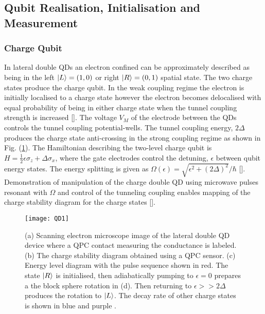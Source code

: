\subsection{Qubit Realisation, Initialisation and Measurement}
\subsubsection{Charge Qubit}
In lateral double QDs an electron confined can be approximately described as being in the left $\lvert L\rangle=(1,0)$ or right $\lvert R\rangle=(0,1)$ spatial state. The two charge states produce the charge qubit. In the weak coupling regime the electron is initially localised to a charge state however the electron becomes delocalised with equal probability of being in either charge state when the tunnel coupling strength is increased []. The voltage $V_{M}$ of the electrode between the QDs controls the tunnel coupling potential-wells. The tunnel coupling energy, $2\Delta$ produces the charge state anti-crossing in the strong coupling regime as shown in Fig. (\ref{fig:QD1}). The Hamiltonian describing the two-level charge qubit is $H=\frac{1}{2}\epsilon \sigma_{z}+\Delta\sigma_{x}$, where the gate electrodes control the detuning, $\epsilon$ between qubit energy states. The energy splitting is given as $\Omega(\epsilon)=\sqrt{\epsilon^{2}+(2\Delta)^{2}}/\hbar$ []. Demonstration of manipulation of the charge double QD using microwave pulses resonant with $\Omega$ and control of the tunneling coupling enables mapping of the charge stability diagram for the charge states []. 

\begin{figure}[b]
\centering
\texttt{[image: QD1]}
\caption{\label{fig:QD1}(a) Scanning electron microscope image of the lateral double QD device where a QPC contact measuring the conductance is labeled. (b) The charge stability diagram obtained using a QPC sensor. (c) Energy level diagram with the pulse sequence shown in red. The state $\lvert R\rangle$ is initialised, then adiabatically pumping to $\epsilon=0$ prepares a the block sphere rotation in (d). Then returning to $\epsilon >> 2\Delta$ produces the rotation to $\lvert L\rangle$. The decay rate of other charge states is shown in blue and purple \citep{Petersson2010QuantumQubit}.}
\end{figure}

